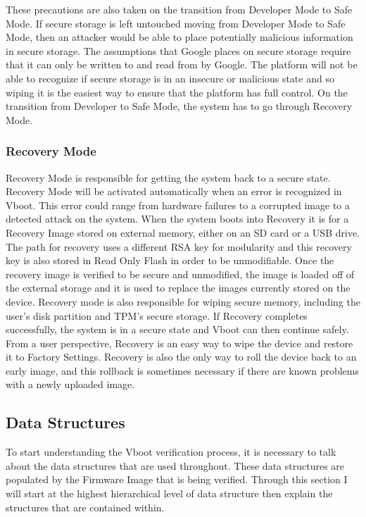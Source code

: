 \documentclass[../report.tex]{subfiles}
\begin{document}
These precautions are also taken on the transition from Developer Mode to Safe Mode. 
If secure storage is left untouched moving from Developer Mode to Safe Mode, then an attacker would be able to place potentially malicious information in secure storage.
The assumptions that Google places on secure storage require that it can only be written to and read from by Google.
The platform will not be able to recognize if secure storage is in an insecure or malicious state and so wiping it is the easiest way to ensure that the platform has full control.
On the transition from Developer to Safe Mode, the system has to go through Recovery Mode.

\subsubsection{Recovery Mode}

Recovery Mode is responsible for getting the system back to a secure state.
Recovery Mode will be activated automatically when an error is recognized in Vboot.
This error could range from hardware failures to a corrupted image to a detected attack on the system.
When the system boots into Recovery it is for a Recovery Image stored on external memory, either on an SD card or a USB drive.
The path for recovery uses a different RSA key for modularity and this recovery key is also stored in Read Only Flash in order to be unmodifiable.
Once the recovery image is verified to be secure and unmodified, the image is loaded off of the external storage and it is used to replace the images currently stored on the device.
Recovery mode is also responsible for wiping secure memory, including the user's disk partition and TPM's secure storage.
If Recovery completes successfully, the system is in a secure state and Vboot can then continue safely.
From a user perspective, Recovery is an easy way to wipe the device and restore it to Factory Settings.
Recovery is also the only way to roll the device back to an early image, and this rollback is sometimes necessary if there are known problems with a newly uploaded image.

\subsection{Data Structures}\label{sec:data-structures}

To start understanding the Vboot verification process, it is necessary to talk about the data structures that are used throughout. 
These data structures are populated by the Firmware Image that is being
verified. 
Through this section I will start at the highest hierarchical level of data structure then explain the structures that are contained within.
\end{document}
